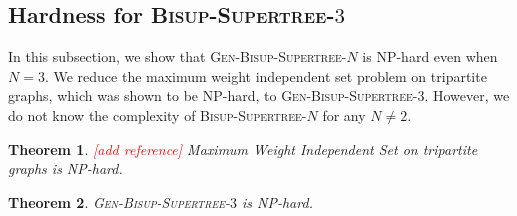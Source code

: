 \documentclass{bmcart}
\newcommand{\note}[1]{\textcolor{red}{#1}}
\newcommand{\bisupn}{\textsc{Bisup-Supertree-$N$}\xspace}
\newcommand{\genbisup}{\textsc{Gen-Bisup-Supertree-$N$}\xspace}
\newcommand{\genbisupthree}{\textsc{Gen-Bisup-Supertree-$3$}\xspace}
\newtheorem{theorem}{Theorem}
\begin{document}
\subsection{Hardness for \textsc{Bisup-Supertree-$3$}}
In this subsection, we show that \genbisup is NP-hard even when $N = 3$. We reduce the maximum weight independent set problem on tripartite graphs, which was shown to be NP-hard, to \genbisupthree. However, we do not know the complexity of \bisupn for any $N \neq 2$. 

\begin{theorem}\label{thm:IS_tripartite_hardness} \note{[add reference]}
Maximum Weight Independent Set on tripartite graphs is NP-hard. 
\end{theorem}

\begin{theorem}\label{thm:hardness}
\genbisupthree is NP-hard.
\end{theorem}
\end{document}
